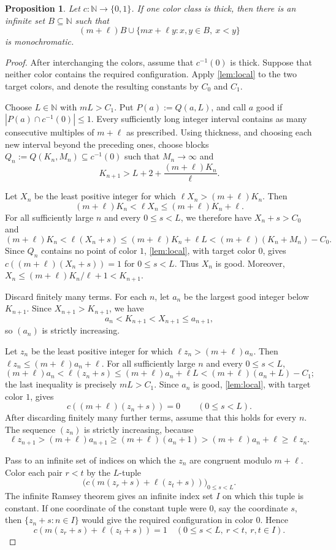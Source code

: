 \documentclass[reqno,12pt]{amsart}
\newtheorem{prop}[thm]{Proposition}
\def \N {\mathbb N}
\numberwithin{equation}{section}
\begin{document}
\begin{prop}\label{prop:thick}
Let $c:\N\to\{0,1\}$. If one color class is thick, then there is an infinite set $B\subseteq\N$ such that
\[
(m+\ell)B\cup\{mx+\ell y:x,y\in B,\ x<y\}
\]
is monochromatic.
\end{prop}

\begin{proof}
After interchanging the colors, assume that $c^{-1}(0)$ is thick. Suppose that neither color contains the required configuration. Apply \cref{lem:local} to the two target colors, and denote the resulting constants by $C_0$ and $C_1$.

Choose $L\in\N$ with $mL>C_1$. Put $P(a):=Q(a,L)$, and call $a$ good if $|P(a)\cap c^{-1}(0)|\leq1$. Every sufficiently long integer interval contains as many consecutive multiples of $m+\ell$ as prescribed. Using thickness, and choosing each new interval beyond the preceding ones, choose blocks $Q_n:=Q(K_n,M_n)\subseteq c^{-1}(0)$ such that $M_n\to\infty$ and
\[
K_{n+1}>L+2+\frac{(m+\ell)K_n}{\ell}.
\]

Let $X_n$ be the least positive integer for which $\ell X_n>(m+\ell)K_n$. Then
\[
(m+\ell)K_n<\ell X_n\leq(m+\ell)K_n+\ell.
\]
For all sufficiently large $n$ and every $0\leq s<L$, we therefore have $X_n+s>C_0$ and
\[
(m+\ell)K_n<\ell(X_n+s)\leq(m+\ell)K_n+\ell L<(m+\ell)(K_n+M_n)-C_0.
\]
Since $Q_n$ contains no point of color $1$, \cref{lem:local}, with target color $0$, gives $c((m+\ell)(X_n+s))=1$ for $0\leq s<L$. Thus $X_n$ is good. Moreover, $X_n\leq (m+\ell)K_n/\ell+1<K_{n+1}$.

Discard finitely many terms. For each $n$, let $a_n$ be the largest good integer below $K_{n+1}$. Since $X_{n+1}>K_{n+1}$, we have
\[
a_n<K_{n+1}<X_{n+1}\leq a_{n+1},
\]
so $(a_n)$ is strictly increasing.

Let $z_n$ be the least positive integer for which $\ell z_n>(m+\ell)a_n$. Then $\ell z_n\leq(m+\ell)a_n+\ell$. For all sufficiently large $n$ and every $0\leq s<L$,
\[
(m+\ell)a_n<\ell(z_n+s)\leq(m+\ell)a_n+\ell L<(m+\ell)(a_n+L)-C_1;
\]
the last inequality is precisely $mL>C_1$. Since $a_n$ is good, \cref{lem:local}, with target color $1$, gives
\[
c((m+\ell)(z_n+s))=0\qquad(0\leq s<L).
\]
After discarding finitely many further terms, assume that this holds for every $n$. The sequence $(z_n)$ is strictly increasing, because
\[
\ell z_{n+1}>(m+\ell)a_{n+1}\geq(m+\ell)(a_n+1)>(m+\ell)a_n+\ell\geq\ell z_n.
\]

Pass to an infinite set of indices on which the $z_n$ are congruent modulo $m+\ell$. Color each pair $r<t$ by the $L$-tuple
\[
\bigl(c(m(z_r+s)+\ell(z_t+s))\bigr)_{0\leq s<L}.
\]
The infinite Ramsey theorem \cite[Chapter~1, Theorem~5]{GrahamRothchildSpencer90} gives an infinite index set $I$ on which this tuple is constant. If one coordinate of the constant tuple were $0$, say the coordinate $s$, then $\{z_n+s:n\in I\}$ would give the required configuration in color $0$. Hence
\[
c(m(z_r+s)+\ell(z_t+s))=1
\quad(0\leq s<L,\ r<t,\ r,t\in I).
\]


\end{proof}
\end{document}

